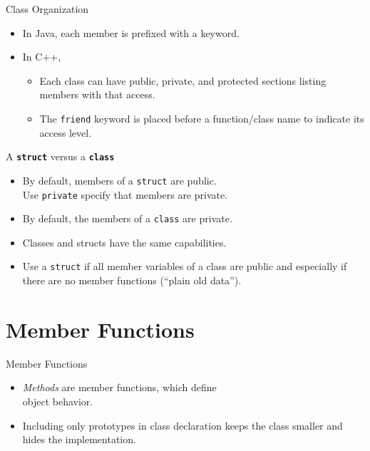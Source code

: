 \documentclass[14pt, aspectratio=1610, hyperref={pdfpagelayout=SinglePage}]{beamer}
\begin{document}
\begin{frame}{Class Organization}
  \begin{itemize}
  \item <+->
    In Java, each member is prefixed with a keyword.
  \item <+->
    In C++,
    \begin{itemize}
    \item Each class can have public, private, and protected sections listing members with that access.
    \item The \lstinline{friend} keyword is placed before a function/class name to indicate its access level.
    \end{itemize}
  \end{itemize}
\end{frame}
 
\begin{frame}[fragile]{A \textbf{\texttt{struct}} versus a \textbf{\texttt{class}}}
\begin{itemize}[<+->]
\item
  By default, members of a \lstinline{struct} are public.\\
  Use \lstinline{private} specify that members are private.
\item
  By default, the members of a \lstinline{class} are private.
\item
  Classes and structs have the same capabilities.
\item
  Use a \lstinline{struct} if all member variables of a class are public and especially if there are no member functions (``plain old data'').
\end{itemize}
\end{frame}

\section{Member Functions}

\begin{frame}{Member Functions}
\begin{itemize}
\item \emph{Methods} are member functions, which define\\ object behavior.
\item Including only prototypes in class declaration keeps the class smaller and hides the implementation.
\end{itemize}
\end{frame}
\end{document}
